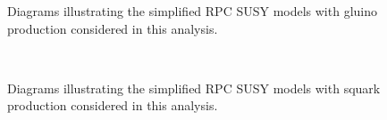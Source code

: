 \begin{figure}[htb!]
\caption{Diagrams illustrating the simplified RPC SUSY models with gluino production considered in this analysis.}
\label{fig:susy_diag_set1}
\end{figure}

\begin{figure}[htb!]
    \centering
     \\
\caption{Diagrams illustrating the simplified RPC SUSY models with squark production considered in this analysis.}
\label{fig:susy_diag_set2}
\end{figure}

